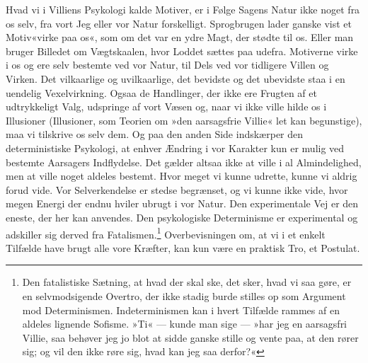 \documentclass[12pt,a4paper,openany]{book}
\newcommand{\opage}[1]{\marginnote{\footnotesize\textit{[#1]}}}
\begin{document}
Hvad vi i Villiens Psykologi kalde Motiver, er i Følge Sagens Natur ikke
noget fra os selv, fra vort Jeg eller vor Natur forskelligt. Sprogbrugen
lader ganske vist et Motiv«virke paa os«, som om det var en ydre Magt,
der stødte til os. Eller man bruger Billedet om Vægtskaalen, hvor Loddet
sættes paa udefra. Motiverne virke i os og ere selv bestemte ved vor
Natur, til Dels ved vor tidligere Villen og Virken. Det vilkaarlige og
uvilkaarlige, det bevidste og det ubevidste staa i en uendelig
Vexelvirkning. Ogsaa de Handlinger, der ikke ere Frugten af et
udtrykkeligt Valg, udspringe af vort Væsen og, naar vi ikke ville hilde
os i Illusioner (Illusioner, som Teorien om »den aarsagsfrie Villie« let
kan begunstige), maa vi tilskrive os selv dem. Og paa den anden Side
indskærper den deterministiske Psykologi, at enhver Ændring i vor
Karakter kun er mulig ved bestemte Aarsagers Indflydelse. Det gælder
altsaa ikke at ville i al Almindelighed, men at ville noget aldeles
bestemt. Hvor meget vi kunne udrette, kunne vi aldrig forud vide. Vor
Selverkendelse er stedse begrænset, og vi kunne ikke vide, hvor megen
Energi der endnu hviler ubrugt i vor Natur. Den experimentale Vej er den
eneste, der her kan anvendes. Den psykologiske Determinisme er
experimental og adskiller sig derved fra Fatalismen.\footnote[2]{Den
fatalistiske Sætning, at hvad der skal ske, det sker, hvad vi saa gøre,
er en selvmodsigende Overtro, der ikke stadig burde stilles op som
Argument mod Determinismen. Indeterminismen kan i hvert Tilfælde rammes
af en aldeles lignende Sofisme. »Ti« --- kunde man sige --- »har jeg en
aarsagsfri Villie, saa behøver jeg jo blot at sidde ganske stille og
vente paa, at den rører sig; og vil den ikke røre sig, hvad kan jeg saa
derfor?«}
\opage{402}Overbevisningen om, at vi i et enkelt Tilfælde have brugt
alle vore Kræfter, kan kun være en praktisk Tro, et Postulat.
\end{document}
